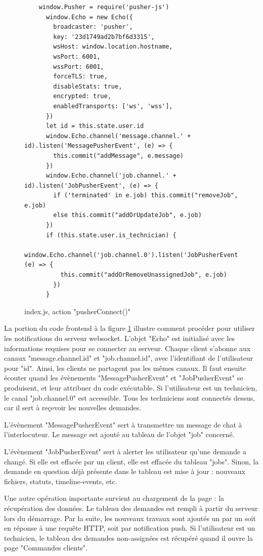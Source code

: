 \documentclass[
    iai, %
    eai, %
]{heig-tb}
\begin{document}
\begin{figure}[h]
  \begin{verbatim}
    window.Pusher = require('pusher-js')
      window.Echo = new Echo({
        broadcaster: 'pusher',
        key: '23d1749ad2b7bf6d3315',
        wsHost: window.location.hostname,
        wsPort: 6001,
        wssPort: 6001,
        forceTLS: true,
        disableStats: true,
        encrypted: true,
        enabledTransports: ['ws', 'wss'],
      })
      let id = this.state.user.id
      window.Echo.channel('message.channel.' + id).listen('MessagePusherEvent', (e) => {
        this.commit("addMessage", e.message)
      })
      window.Echo.channel('job.channel.' + id).listen('JobPusherEvent', (e) => {
        if ('terminated' in e.job) this.commit("removeJob", e.job)
        else this.commit("addOrUpdateJob", e.job)
      })
      if (this.state.user.is_technician) {
        window.Echo.channel('job.channel.0').listen('JobPusherEvent', (e) => {
          this.commit("addOrRemoveUnassignedJob", e.job)
        })
      }
  \end{verbatim}
  \caption{index.js, action "pusherConnect()"}
  \label{figure:pusherConnect}
\end{figure}

\newpage
La portion du code frontend à la figure \ref{figure:pusherConnect} illustre comment procéder pour utiliser les notifications du serveur websocket. L'objet "Echo" est initialisé avec les informations requises pour se connecter au serveur. Chaque client s'abonne aux canaux "message.channel.{id}" et "job.channel.{id}", avec l'identifiant de l'utilisateur pour "{id}". Ainsi, les clients ne partagent pas les mêmes canaux. Il faut ensuite écouter quand les évènements "MessagePusherEvent" et "JobPusherEvent" se produisent, et leur attribuer du code exécutable.
Si l'utilisateur est un technicien, le canal "job.channel.0" est accessible. Tous les techniciens sont connectés dessus, car il sert à reçevoir les nouvelles demandes.

L'évènement "MessagePusherEvent" sert à transmettre un message de chat à l'interlocuteur. Le message est ajouté au tableau de l'objet "job" concerné.

L'évènement "JobPusherEvent" sert à alerter les utilisateur qu'une demande a changé. Si elle est effacée par un client, elle est effacée du tableau "jobs". Sinon, la demande en question déjà présente dans le tableau est mise à jour : nouveaux fichiers, statuts, timeline-events, etc.

Une autre opération importante survient au chargement de la page : la récupération des données. Le tableau des demandes est rempli à partir du serveur lors du démarrage. Par la suite, les nouveaux travaux sont ajoutés un par un soit en réponse à une requête HTTP, soit par notification push.
Si l'utilisateur est un technicien, le tableau des demandes non-assignées est récupéré quand il ouvre la page "Commandes clients".
\end{document}
